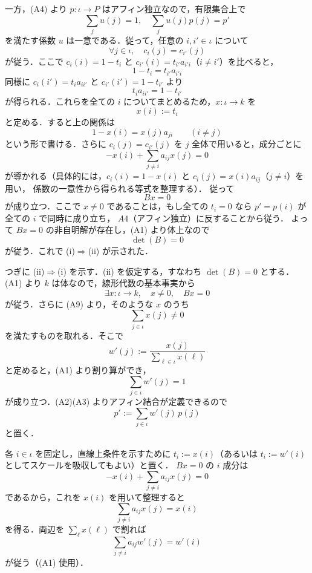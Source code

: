 \documentclass[a4paper,12pt]{bxjsbook}
\makeatletter
\newlength{\customindent}
\theoremstyle{theorem}
\renewenvironment{proof}[1][\proofname]{%
  \par\pushQED{\qed}%
  \normalfont
  \topsep6\p@\@plus6\p@\relax
  \list{}{%
    \leftmargin=\customindent
    \rightmargin=0pt
    \labelwidth=0pt
    \labelsep=0pt
    \itemindent=0pt
    \listparindent=0pt
    \parsep=0pt
  }%
  \item[\itshape #1\@addpunct{.}\hspace{0.5em}]%
  \setlength{\displayindent}{\customindent}%
  \setlength{\displaywidth}{\dimexpr\linewidth-\customindent\relax}%
  \ignorespaces
}{%
  \popQED\endlist\@endpefalse
}
\makeatother
\begin{document}
\begin{proof}
        一方，(A4) より $p:\iota\to P$ はアフィン独立なので，有限集合上で
        \[
          \sum_{j}u(j)=1,\quad \sum_{j}u(j)p(j)=p'
        \]
        を満たす係数 $u$ は一意である．従って，任意の $i,i'\in\iota$ について
        \[
          \forall j\in\iota,\quad c_i(j)=c_{i'}(j)
        \]
        が従う．ここで $c_i(i)=1-t_i$ と $c_{i'}(i)=t_{i'}a_{i'i}$（$i\neq i'$）を比べると，
        \[
          1-t_i=t_{i'}a_{i'i}
        \]
        同様に $c_i(i')=t_i a_{ii'}$ と $c_{i'}(i')=1-t_{i'}$ より
        \[
          t_i a_{ii'}=1-t_{i'}
        \]
        が得られる．これらを全ての $i$ についてまとめるため，$x:\iota\to k$ を
        \[
          x(i):=t_i
        \]
        と定める．すると上の関係は
        \[
          1-x(i)=x(j)a_{ji}\qquad (i\neq j)
        \]
        という形で書ける．さらに $c_i(j)=c_{i'}(j)$ を $j$ 全体で用いると，成分ごとに
        \[
          -x(i)+\sum_{j\neq i}a_{ij}x(j)=0
        \]
        が導かれる（具体的には，$c_i(i)=1-x(i)$ と $c_i(j)=x(i)a_{ij}$（$j\neq i$）を用い，
        係数の一意性から得られる等式を整理する）．
        従って
        \[
          Bx=0
        \]
        が成り立つ．ここで $x\neq 0$ であることは，もし全ての $t_i=0$ なら $p'=p(i)$ が全ての $i$ で同時に成り立ち，
        $A4$（アフィン独立）に反することから従う．
        よって $Bx=0$ の非自明解が存在し，(A1) より体上なので
        \[
          \det(B)=0
        \]
        が従う．これで (i)$\Rightarrow$(ii) が示された．
        
        つぎに (ii)$\Rightarrow$(i) を示す．(ii) を仮定する，すなわち $\det(B)=0$ とする．
        (A1) より $k$ は体なので，線形代数の基本事実から
        \[
          \exists x:\iota\to k,\quad x\neq 0,\quad Bx=0
        \]
        が従う．さらに (A9) より，そのような $x$ のうち
        \[
          \sum_{j\in\iota}x(j)\neq 0
        \]
        を満たすものを取れる．そこで
        \[
          w'(j):=\frac{x(j)}{\sum_{\ell\in\iota}x(\ell)}
        \]
        と定めると，(A1) より割り算ができ，
        \[
          \sum_{j\in\iota}w'(j)=1
        \]
        が成り立つ．(A2)(A3) よりアフィン結合が定義できるので
        \[
          p':=\sum_{j\in\iota} w'(j)\,p(j)
        \]
        と置く．
        
        各 $i\in\iota$ を固定し，直線上条件を示すために $t_i:=x(i)$（あるいは $t_i:=w'(i)$ としてスケールを吸収してもよい）と置く．
        $Bx=0$ の $i$ 成分は
        \[
          -x(i)+\sum_{j\neq i}a_{ij}x(j)=0
        \]
        であるから，これを $x(i)$ を用いて整理すると
        \[
          \sum_{j\neq i}a_{ij}x(j)=x(i)
        \]
        を得る．両辺を $\sum_{\ell}x(\ell)$ で割れば
        \[
          \sum_{j\neq i}a_{ij}w'(j)=w'(i)
        \]
        が従う（(A1) 使用）．
        

\end{proof}
\end{document}
